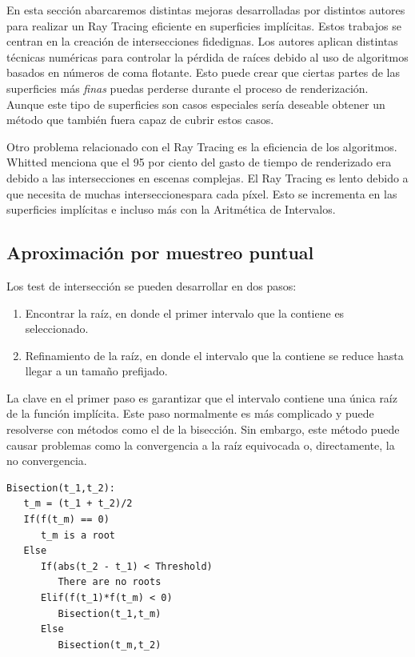 En esta sección abarcaremos distintas mejoras desarrolladas por distintos autores para realizar un Ray Tracing eficiente en superficies implícitas. Estos trabajos se centran en la creación de intersecciones fidedignas. Los autores aplican distintas técnicas numéricas para controlar la pérdida de raíces debido al uso de algoritmos basados en números de coma flotante. Esto puede crear que ciertas partes de las superficies más{ \em finas} puedas perderse durante el proceso de renderización. Aunque este tipo de superficies son casos especiales  sería deseable obtener un método que también fuera capaz de cubrir estos casos.
\par Otro problema relacionado con el Ray Tracing  es la eficiencia de los algoritmos. Whitted\cite{Whitted80} menciona que el 95 por ciento del gasto de tiempo de renderizado era debido a las intersecciones en escenas complejas. El Ray Tracing es lento debido a que necesita de muchas interseccionespara cada píxel. Esto se incrementa en las superficies implícitas e incluso más con la Aritmética de Intervalos.

\subsection{Aproximación por muestreo puntual}

Los test de intersección se pueden desarrollar en dos pasos:

\begin{enumerate}
\item Encontrar la raíz, en donde el primer intervalo que la contiene es seleccionado.
\item Refinamiento de la raíz, en donde el intervalo que la contiene se reduce hasta llegar a un tamaño prefijado.
\end{enumerate}

La clave en el primer paso es garantizar que el intervalo contiene una única raíz de la función implícita. Este paso normalmente es más complicado y puede resolverse con métodos como el de la bisección. Sin embargo, este método puede causar problemas como la convergencia a la raíz equivocada o, directamente, la no convergencia.

\begin{verbatim}
Bisection(t_1,t_2):
   t_m = (t_1 + t_2)/2   
   If(f(t_m) == 0)
      t_m is a root
   Else
      If(abs(t_2 - t_1) < Threshold)
         There are no roots
      Elif(f(t_1)*f(t_m) < 0)
         Bisection(t_1,t_m)
      Else
         Bisection(t_m,t_2)
\end{verbatim}

